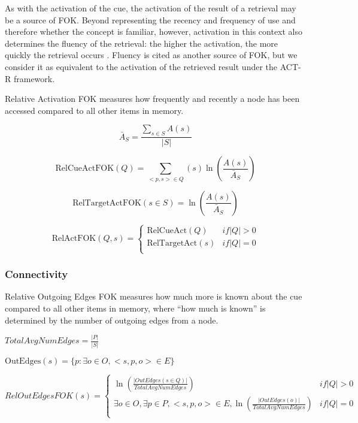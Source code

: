 \documentclass[10pt,letterpaper]{article}
\begin{document}
As with the activation of the cue, the activation of the result of a retrieval may be a source of FOK.
Beyond representing the recency and frequency of use and therefore whether the concept is familiar, however, activation in this context also determines the fluency of the retrieval: the higher the activation, the more quickly the retrieval occurs \cite{Anderson2004AnIntegratedTheory}.
Fluency is cited as another source of FOK, but we consider it as equivalent to the activation of the retrieved result under the ACT-R framework.

Relative Activation FOK measures how frequently and recently a node has been accessed compared to all other items in memory.

$$\bar{A}_S = \frac {\sum_{s{\in}S} {A(s)}}{|S|}$$

$$\text{RelCueActFOK}(Q) = \sum_{<p, s> \in Q} (s) \ln(\frac{A(s)}{\bar{A}_S})$$

$$\text{RelTargetActFOK}(s{\in}S) = \ln(\frac{A(s)}{\bar{A}_S})$$

$$\text{RelActFOK}(Q, s) =
\begin{cases}
    \text{RelCueAct}(Q) & {if |Q| > 0} \\
    \text{RelTargetAct}(s)& {if |Q| = 0} \\
\end{cases}
$$

\subsubsection{Connectivity}

Relative Outgoing Edges FOK measures how much more is known about the cue compared to all other items in memory, where “how much is known” is determined by the number of outgoing edges from a node.

$TotalAvgNumEdges = \frac{|P|}{|S|}$

$\text{OutEdges}(s) = \{p : \exists o{\in}O, <s, p, o>{\in}E \}$

$$RelOutEdgesFOK(s) =
\begin{cases}
    \ln (\frac{|OutEdges(s \in Q)|}{TotalAvgNumEdges}) & {if |Q| > 0} \\
    \exists o{\in}O, \exists p{\in}P, <s, p, o>{\in}E, \ln(\frac{|OutEdges(o)|}{TotalAvgNumEdges}) & {if |Q| = 0} \\
\end{cases}
$$
\end{document}
